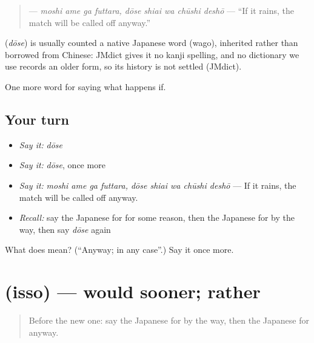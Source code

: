 \begin{quote}
\textbf{    } — \emph{moshi ame ga futtara, dōse shiai wa chūshi deshō} — \textquotedblleft{}If it rains, the match will be called off anyway.\textquotedblright{}
\end{quote}

\begin{cousinweb}
\textbf{} (\emph{dōse}) is usually counted a native Japanese word (wago), inherited rather than borrowed from Chinese: JMdict gives it no kanji spelling, and no dictionary we use records an older form, so its history is not settled (JMdict).
\end{cousinweb}

\begin{grammarlens}[title={What you've built}]
One more word for saying what happens if.
\end{grammarlens}

\subsection*{Your turn}
\begin{itemize}
\raggedright
  \item \emph{Say it:} \emph{dōse}
  \item \emph{Say it:} \emph{dōse}, once more
  \item \emph{Say it:} \emph{moshi ame ga futtara, dōse shiai wa chūshi deshō} — If it rains, the match will be called off anyway.
  \item \emph{Recall:} say the Japanese for for some reason, then the Japanese for by the way, then say \emph{dōse} again
\end{itemize}

\begin{tcolorbox}[breakable,colback=teal!4,colframe=teal!35!black,title={Before you move on}]
What does  mean? (\textquotedblleft{}Anyway; in any case\textquotedblright{}.) Say it once more.
\end{tcolorbox}
\section[\texorpdfstring{\ja{いっそ} (isso)}{いっそ (isso)}]{ (isso) — would sooner; rather}

\label{lesson:JA-C529-isso}



\begin{quote}
Before the new one: say the Japanese for by the way, then the Japanese for anyway.
\end{quote}

